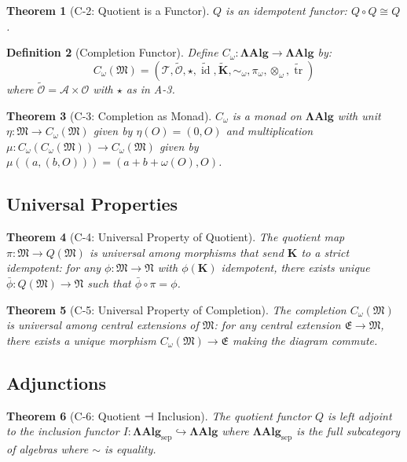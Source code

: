 \documentclass[12pt, oneside]{article}
\newtheorem{theorem}{Theorem}[section]
\newtheorem{definition}[theorem]{Definition}
\DeclareMathOperator{\id}{id}
\DeclareMathOperator{\tr}{tr}
\newcommand{\K}{\mathbf{K}}
\newcommand{\A}{\mathcal{A}}
\newcommand{\T}{\mathcal{T}}
\newcommand{\Opr}{\mathcal{O}}
\newcommand{\wtilde}{\widetilde}
\newcommand{\mf}[1]{\mathfrak{#1}}
\begin{document}
\begin{theorem}[C-2: Quotient is a Functor]
$Q$ is an idempotent functor: $Q \circ Q \cong Q$.
\end{theorem}

\begin{definition}[Completion Functor]
Define $C_\omega: \mathbf{ΛAlg} \rightarrow \mathbf{ΛAlg}$ by:
\begin{equation}
C_\omega(\mf{M}) = (\T, \wtilde{\Opr}, \star, \wtilde{\id}, \wtilde{\K}, \sim_\omega, \pi_\omega, \otimes_\omega, \wtilde{\tr})
\end{equation}
where $\wtilde{\Opr} = \A \times \Opr$ with $\star$ as in A-3.
\end{definition}

\begin{theorem}[C-3: Completion as Monad]
$C_\omega$ is a monad on $\mathbf{ΛAlg}$ with unit $\eta: \mf{M} \rightarrow C_\omega(\mf{M})$ given by $\eta(O) = (0, O)$ and multiplication $\mu: C_\omega(C_\omega(\mf{M})) \rightarrow C_\omega(\mf{M})$ given by $\mu((a, (b, O))) = (a + b + \omega(O), O)$.
\end{theorem}

\subsection{Universal Properties}

\begin{theorem}[C-4: Universal Property of Quotient]
The quotient map $\pi: \mf{M} \rightarrow Q(\mf{M})$ is universal among morphisms that send $\K$ to a strict idempotent: for any $\phi: \mf{M} \rightarrow \mf{N}$ with $\phi(\K)$ idempotent, there exists unique $\bar{\phi}: Q(\mf{M}) \rightarrow \mf{N}$ such that $\bar{\phi} \circ \pi = \phi$.
\end{theorem}

\begin{theorem}[C-5: Universal Property of Completion]
The completion $C_\omega(\mf{M})$ is universal among central extensions of $\mf{M}$: for any central extension $\mf{E} \rightarrow \mf{M}$, there exists a unique morphism $C_\omega(\mf{M}) \rightarrow \mf{E}$ making the diagram commute.
\end{theorem}

\subsection{Adjunctions}

\begin{theorem}[C-6: Quotient ⊣ Inclusion]
The quotient functor $Q$ is left adjoint to the inclusion functor $I: \mathbf{ΛAlg}_{\text{sep}} \hookrightarrow \mathbf{ΛAlg}$ where $\mathbf{ΛAlg}_{\text{sep}}$ is the full subcategory of algebras where $\sim$ is equality.
\end{theorem}
\end{document}
